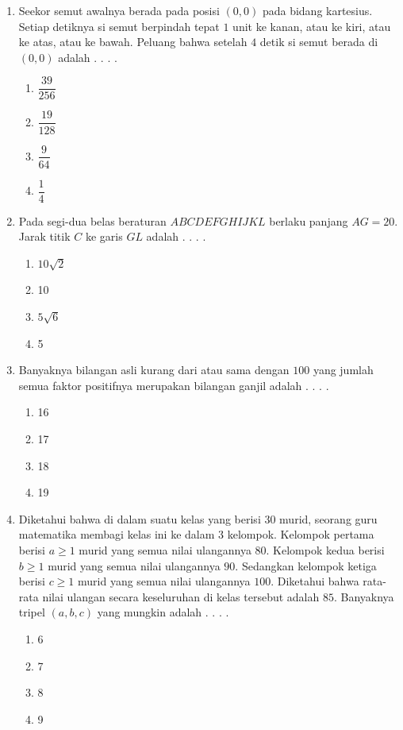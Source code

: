 \documentclass[12pt]{scrartcl}
\begin{document}
\begin{enumerate}
    \item Seekor semut awalnya berada pada posisi $(0, 0)$ pada bidang kartesius. Setiap detiknya si semut berpindah tepat $1$ unit ke kanan, atau ke kiri, atau ke atas, atau ke bawah. Peluang bahwa setelah $4$ detik si semut berada di $(0, 0)$ adalah . . . .
    \begin{enumerate}[label={(\Alph*)}]
        \item $\dfrac{39}{256}$ \item $\dfrac{19}{128}$ \item $\dfrac{9}{64}$ \item $\dfrac{1}{4}$
    \end{enumerate}

    \item Pada segi-dua belas beraturan $ABCDEFGHIJKL$ berlaku panjang $AG=20$. Jarak titik $C$ ke garis $GL$ adalah . . . .
    \begin{enumerate}[label={(\Alph*)}]
        \item $10\sqrt{2}$ \item 10 \item $5\sqrt{6}$ \item 5
    \end{enumerate}

    \item Banyaknya bilangan asli kurang dari atau sama dengan $100$ yang jumlah semua faktor positifnya merupakan bilangan ganjil adalah . . . .
    \begin{enumerate}[label={(\Alph*)}]
        \item 16 \item 17 \item 18 \item 19
    \end{enumerate}

    \item Diketahui bahwa di dalam suatu kelas yang berisi $30$ murid, seorang guru matematika membagi kelas ini ke dalam 3 kelompok. Kelompok pertama berisi $a\ge 1$ murid yang semua nilai ulangannya $80$. Kelompok kedua berisi $b\ge 1$ murid yang semua nilai ulangannya $90$. Sedangkan kelompok ketiga berisi $c\ge 1$ murid yang semua nilai ulangannya $100$. Diketahui bahwa rata-rata nilai ulangan secara keseluruhan di kelas tersebut adalah $85$. Banyaknya tripel $(a,b,c)$ yang mungkin adalah . . . .
    \begin{enumerate}[label={(\Alph*)}]
        \item 6 \item 7 \item 8 \item 9
    \end{enumerate}


\end{enumerate}
\end{document}
